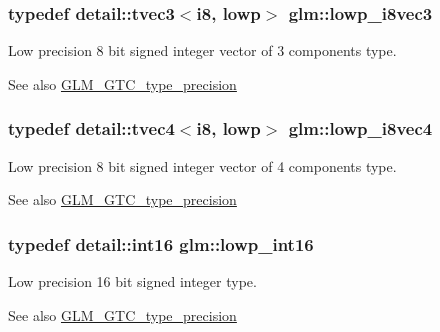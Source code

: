 \subsubsection[{\texorpdfstring{lowp\+\_\+i8vec3}{lowp_i8vec3}}]{\setlength{\rightskip}{0pt plus 5cm}typedef detail\+::tvec3$<$i8, lowp$>$ {\bf glm\+::lowp\+\_\+i8vec3}}\hypertarget{group__gtc__type__precision_ga048811f03c327d4b56564a72d98800e8}{}\label{group__gtc__type__precision_ga048811f03c327d4b56564a72d98800e8}
Low precision 8 bit signed integer vector of 3 components type. \begin{DoxySeeAlso}{See also}
\hyperlink{group__gtc__type__precision}{G\+L\+M\+\_\+\+G\+T\+C\+\_\+type\+\_\+precision} 
\end{DoxySeeAlso}
\subsubsection[{\texorpdfstring{lowp\+\_\+i8vec4}{lowp_i8vec4}}]{\setlength{\rightskip}{0pt plus 5cm}typedef detail\+::tvec4$<$i8, lowp$>$ {\bf glm\+::lowp\+\_\+i8vec4}}\hypertarget{group__gtc__type__precision_ga095202095a1fefbdae4a974c3b750223}{}\label{group__gtc__type__precision_ga095202095a1fefbdae4a974c3b750223}
Low precision 8 bit signed integer vector of 4 components type. \begin{DoxySeeAlso}{See also}
\hyperlink{group__gtc__type__precision}{G\+L\+M\+\_\+\+G\+T\+C\+\_\+type\+\_\+precision} 
\end{DoxySeeAlso}
\subsubsection[{\texorpdfstring{lowp\+\_\+int16}{lowp_int16}}]{\setlength{\rightskip}{0pt plus 5cm}typedef detail\+::int16 {\bf glm\+::lowp\+\_\+int16}}\hypertarget{group__gtc__type__precision_ga71fc0c399fa4780507748b643733f153}{}\label{group__gtc__type__precision_ga71fc0c399fa4780507748b643733f153}
Low precision 16 bit signed integer type. \begin{DoxySeeAlso}{See also}
\hyperlink{group__gtc__type__precision}{G\+L\+M\+\_\+\+G\+T\+C\+\_\+type\+\_\+precision} 
\end{DoxySeeAlso}
